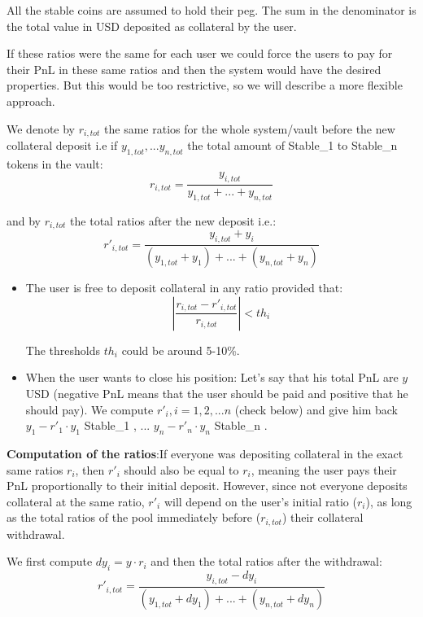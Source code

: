 \documentclass{article}
\begin{document}
All the stable coins are assumed to hold their peg. The sum in the denominator is the total value in USD deposited as collateral by the user. 

If these ratios were the same for each user we could force the users to pay for their PnL in these same ratios and then the system would have the desired properties. But this would be too restrictive, so we will describe a more flexible approach.

We denote by $r_{i,tot}$ the same ratios for the whole system/vault before the new collateral deposit i.e if $y_{1,tot},...y_{n,tot}$ the total amount of Stable\_1 to Stable\_n tokens in the vault:
\begin{equation}
r_{i,tot}=\frac{y_{i,tot}}{y_{1,tot}+...+y_{n,tot}}
\end{equation}

and by $r_{i,tot}$ the total ratios after the new deposit i.e.:
\begin{equation}
r'_{i,tot}=\frac{y_{i,tot}+y_i}{(y_{1,tot}+y_1)+...+(y_{n,tot}+y_n)}
\end{equation}

\begin{itemize}
\item The user is free to deposit collateral in any ratio provided that:
\begin{equation}\label{deposit condition}
\left| \frac{r_{i,tot}-r'_{i,tot}}{r_{i,tot}}\right|< th_i
\end{equation}

The thresholds $th_i$ could be around 5-10\%.

\item When the user wants to close his position: Let's say that his total PnL are $y$ USD (negative PnL means that the user should be paid and positive that he should pay). We compute $r'_i, i=1,2,...n$ (check below) and give him back $y_1 - r'_1\cdot y_1 $ Stable\_1 , ... $y_n - r'_n\cdot y_n $ Stable\_n .
\end{itemize}

\textbf{Computation of the ratios}:If everyone was depositing collateral in the exact same ratios $r_i$, then $r'_i$ should also be equal to $r_i$, meaning the user pays their PnL proportionally to their initial deposit. However, since not everyone deposits collateral at the same ratio, $r'_i$ will depend on the user's initial ratio ($r_i$), as long as the total ratios of the pool immediately before ($r_{i,tot}$) their collateral withdrawal.

We first compute $dy_i=y\cdot r_i$ and then the total ratios after the withdrawal:
\begin{equation}\label{withdrawal condition}
r'_{i,tot}=\frac{y_{i,tot}-dy_i}{(y_{1,tot}+dy_1)+...+(y_{n,tot}+dy_n)}
\end{equation}
\end{document}
